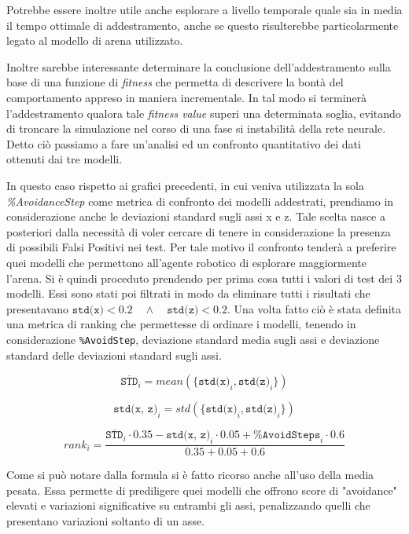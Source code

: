 Potrebbe essere inoltre utile anche esplorare a livello temporale quale sia in media il tempo ottimale di addestramento, anche se questo risulterebbe particolarmente legato al modello di arena utilizzato.

Inoltre sarebbe interessante determinare la conclusione dell'addestramento sulla base di una funzione di \textit{fitness} che permetta di descrivere la bontà del comportamento appreso in maniera incrementale. In tal modo si terminerà l'addestramento qualora tale \textit{fitness value} superi una determinata soglia, evitando di troncare la simulazione nel corso di una fase si instabilità della rete neurale.
\hfill\break
Detto ciò passiamo a fare un'analisi ed un confronto quantitativo dei dati ottenuti dai tre modelli. 

In questo caso rispetto ai grafici precedenti, in cui veniva utilizzata la sola \textit{\%AvoidanceStep} come  metrica di confronto dei modelli addestrati, prendiamo in considerazione anche le deviazioni standard sugli assi x e z. Tale scelta nasce a posteriori dalla necessità di voler cercare di tenere in considerazione la presenza di possibili Falsi Positivi nei test. Per tale motivo il confronto tenderà a preferire quei modelli che permettono all'agente robotico di esplorare maggiormente l'arena. Si è quindi proceduto prendendo per prima cosa tutti i valori di test dei 3 modelli. Essi sono stati poi filtrati in modo da eliminare tutti i risultati che presentavano $\texttt{std(x)} < 0.2 \quad\wedge\quad \texttt{std(z)} < 0.2$. Una volta fatto ciò è stata definita una metrica di ranking che permettesse di ordinare i modelli, tenendo in considerazione \texttt{\%AvoidStep}, deviazione standard media sugli assi e deviazione standard delle deviazioni standard sugli assi. 

$$\overline{\texttt{STD}}_i = mean(\{\texttt{std(x)}_i, \texttt{std(z)}_i\})$$

$$\texttt{std(x, z)}_i = std(\{\texttt{std(x)}_i, \texttt{std(z)}_i\})$$

$$rank_i = \frac{\overline{\texttt{STD}}_i \cdot 0.35 - \texttt{std(x, z)}_i \cdot 0.05 + \texttt{\%AvoidSteps}_i \cdot 0.6}{0.35 + 0.05 + 0.6}$$

\hfill\break

Come si può notare dalla formula si è fatto ricorso anche all'uso della media pesata. Essa permette di prediligere quei modelli che offrono score di "avoidance" elevati e variazioni significative su entrambi gli assi, penalizzando quelli che presentano variazioni soltanto di un asse. 

